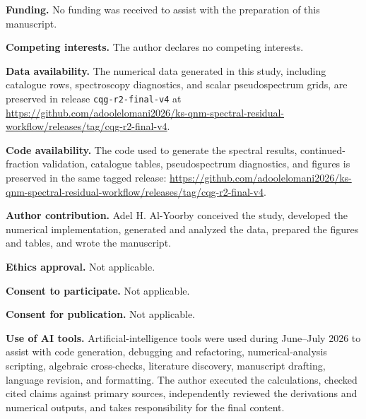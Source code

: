 \documentclass[12pt,a4paper]{article}
\begin{document}
\noindent\textbf{Funding.}
No funding was received to assist with the preparation of this manuscript.

\noindent\textbf{Competing interests.}
The author declares no competing interests.

\noindent\textbf{Data availability.}
The numerical data generated in this study, including catalogue rows,
spectroscopy diagnostics, and scalar pseudospectrum grids, are preserved in
release \texttt{cqg-r2-final-v4} at
\url{https://github.com/adoolelomani2026/ks-qnm-spectral-residual-workflow/releases/tag/cqg-r2-final-v4}.

\noindent\textbf{Code availability.}
The code used to generate the spectral results, continued-fraction validation,
catalogue tables, pseudospectrum diagnostics, and figures is preserved in the
same tagged release:
\url{https://github.com/adoolelomani2026/ks-qnm-spectral-residual-workflow/releases/tag/cqg-r2-final-v4}.

\noindent\textbf{Author contribution.}
Adel H. Al-Yoorby conceived the study, developed the numerical implementation, generated and analyzed the data, prepared the figures and tables, and wrote the manuscript.

\noindent\textbf{Ethics approval.}
Not applicable.

\noindent\textbf{Consent to participate.}
Not applicable.

\noindent\textbf{Consent for publication.}
Not applicable.

\noindent\textbf{Use of AI tools.}
Artificial-intelligence tools were used during June--July 2026 to assist with
code generation, debugging and refactoring,
numerical-analysis scripting, algebraic cross-checks, literature discovery,
manuscript drafting, language revision, and formatting. The author executed
the calculations, checked cited claims against primary sources, independently
reviewed the derivations and numerical outputs, and takes responsibility for
the final content.
\end{document}
